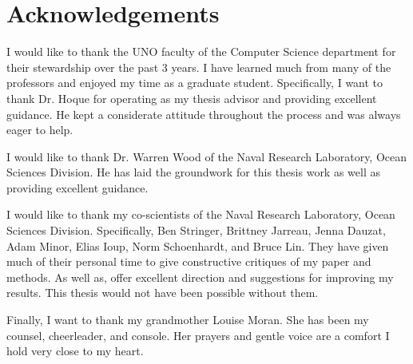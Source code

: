 \setcounter{secnumdepth}{0}
\section{Acknowledgements}
I would like to thank the UNO faculty of the Computer Science department for their stewardship over the past 3 years.
I have learned much from many of the professors and enjoyed my time as a graduate student.
Specifically, I want to thank Dr. Hoque for operating as my thesis advisor and providing excellent guidance.
He kept a considerate attitude throughout the process and was always eager to help.

I would like to thank Dr. Warren Wood of the Naval Research Laboratory, Ocean Sciences Division.
He has laid the groundwork for this thesis work as well as providing excellent guidance.

I would like to thank my co-scientists of the Naval Research Laboratory, Ocean Sciences Division. Specifically, Ben Stringer, Brittney Jarreau, Jenna Dauzat, Adam Minor, Elias Ioup, Norm Schoenhardt, and Bruce Lin.
They have given much of their personal time to give constructive critiques of my paper and methods.
As well as, offer excellent direction and suggestions for improving my results.
This thesis would not have been possible without them.

Finally, I want to thank my grandmother Louise Moran. 
She has been my counsel, cheerleader, and console.
Her prayers and gentle voice are a comfort I hold very close to my heart.
